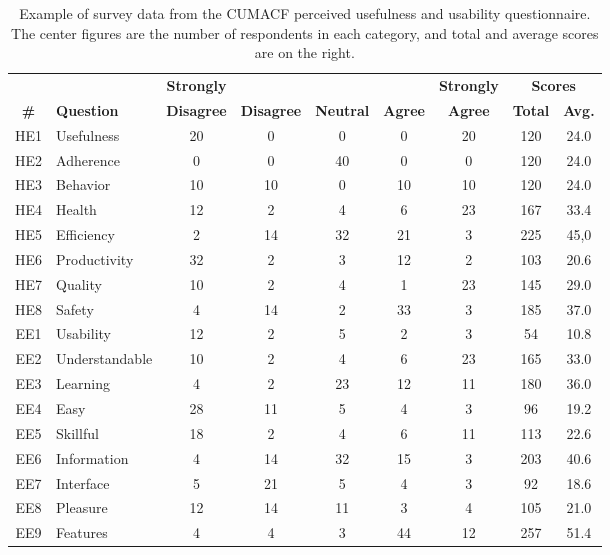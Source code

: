 \begin{table}[htp]
\caption{Example of survey data from the \ac{CUMACF} perceived usefulness and usability questionnaire. The center figures are the number of respondents in each category, and total and average scores are on the right.}
\centering
\scriptsize
\begin{tabular}{|c p{2.0cm}| c c c c c | c c|}
\toprule 
\hline
\textbf{}	& \textbf{} &	\textbf{Strongly} &	\textbf{} &	\textbf{} &	\textbf{}  &	\textbf{Strongly}  &	\multicolumn{2}{c|}{\textbf{Scores}} \\
\textbf{\#}	& \textbf{Question} &	\textbf{Disagree} &	\textbf{Disagree} &	\textbf{Neutral} &	\textbf{Agree}  &	\textbf{Agree}  &	\textbf{Total}  &	\textbf{Avg.} \\
\hline
\hline
HE1	& Usefulness    &	20 & 	 0 & 	 0 & 	 0 & 	20 & 	120 &	24.0\\
HE2	& Adherence     &	 0 & 	 0 & 	40 & 	 0 & 	 0 & 	120 &	24.0\\
HE3	&Behavior       &	10 & 	10 & 	 0 & 	10 & 	10 & 	120 &	24.0\\
HE4	& Health        &	12 & 	 2 & 	 4 & 	 6 &	23 & 	167 &	33.4\\
HE5	& Efficiency    &	 2 & 	14 &	32 & 	21 & 	 3 &	225 &	45,0\\
HE6	& Productivity  &	32 & 	 2 & 	 3 &	12 & 	 2 & 	103 &   20.6\\
HE7	& Quality       &	10 & 	 2 & 	 4 &	 1 & 	23 &	145 &	29.0\\
HE8	& Safety        &	 4 &	14 &     2 & 	33 & 	 3 & 	185 &   37.0\\
\hline
EE1	& Usability     &	12 & 	 2 & 	 5 &	 2 & 	 3 &	 54 &	10.8\\
EE2	& Understandable &	10 & 	 2 & 	 4 & 	 6 &	23 & 	165 &	33.0\\
EE3	& Learning      &	 4 &	 2 & 	23 &    12 & 	11 & 	180 &	36.0\\
EE4	& Easy          &	28 &	11 & 	 5 &	 4 &	 3 &	 96 &	19.2\\
EE5	& Skillful      &	18 &	 2 & 	 4 &	 6 &	11 & 	113 &	22.6\\
EE6	& Information   &    4 &	14 &    32 & 	15 &	 3 &	203 &   40.6\\
EE7	& Interface     &	 5 &	21 & 	 5 &	 4 &	 3 &	 92 &	18.6\\
EE8	& Pleasure      &	12 &	14 &	11 &	 3 &	 4 &	105 &	21.0\\
EE9	& Features      & 	 4 &	 4 &     3 &	44 &	12 &	257 &   51.4\\
\hline
\bottomrule
\end{tabular}
\label{tab:survey}
\end{table}

